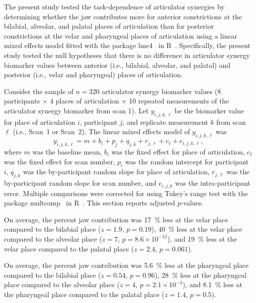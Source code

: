 \documentclass[reprint]{JASAnew}\usepackage[]{graphicx}\usepackage[]{color}
\begin{document}
The present study tested the task-dependence of articulator synergies by determining whether the jaw contributes more for anterior constrictions at the bilabial, alveolar, and palatal places of articulation than for posterior constrictions at the velar and pharyngeal places of articulation using a linear mixed effects model fitted with the package lme4~\citep{bates2015fitting} in R~\citep{r2017language}. Specifically, the present study tested the null hypotheses that there is no difference in articulator synergy biomarker values between anterior (i.e., bilabial, alveolar, and palatal) and posterior (i.e., velar and pharyngeal) places of articulation.

Consider the sample of $n=320$ articulator synergy biomarker values (\num{8} participants $\times$ \num{4} places of articulation $\times$ \num{10} repeated measurements of the articulator synergy biomarker from scan \num{1}). Let $y_{i,j,k,\ell}$ be the biomarker value for place of articulation $i$, participant $j$, and replicate measurement $k$ from scan $\ell$ (i.e., Scan~\num{1} or Scan~\num{2}). The linear mixed effects model of $y_{i,j,k,\ell}$ was 
%
\begin{equation}
y_{i,j,k,\ell} = m + b_i + p_j + q_{j,k} + r_{j,\ell} + c_\ell + e_{i,j,k,\ell},
\end{equation}
%
where $m$ was the baseline mean, $b_i$ was the fixed effect for place of articulation, $c_\ell$ was the fixed effect for scan number, $p_i$ was the random intercept for participant $i$, $q_{j,k}$ was the by-participant random slope for place of articulation, $r_{j,\ell}$ was the by-participant random slope for scan number, and $e_{i,j,k}$ was the intra-participant error. Multiple comparisons were corrected for using Tukey's range test with the package multcomp~\citep{hothorn2008simultaneous} in R~\citep{r2017language}. This section reports adjusted $p$-values. 

%
On average, the percent jaw contribution was 
%
%
\SI{17}{\percent} 
less at the velar place compared to the bilabial place
($z=1.9$, 
$p=0.19$),
%
%
\SI{40}{\percent} 
less at the velar place compared to the alveolar place
($z=7$, 
$p=\ensuremath{8.6\times 10^{-12}}$), and
%
%
\SI{19}{\percent} 
less at the velar place compared to the palatal place
($z=2.4$, 
$p=0.061$).




%
On average, the percent jaw contribution was 
%
%
\SI{5.6}{\percent} 
less at the pharyngeal place compared to the bilabial place
($z=0.54$, 
$p=0.96$),
%
%
\SI{28}{\percent} 
less at the pharyngeal place compared to the alveolar place
($z=4$, 
$p=\ensuremath{2.1\times 10^{-4}}$), and
%
%
\SI{8.1}{\percent} 
less at the pharyngeal place compared to the palatal place
($z=1.4$, 
$p=0.5$).
\end{document}
